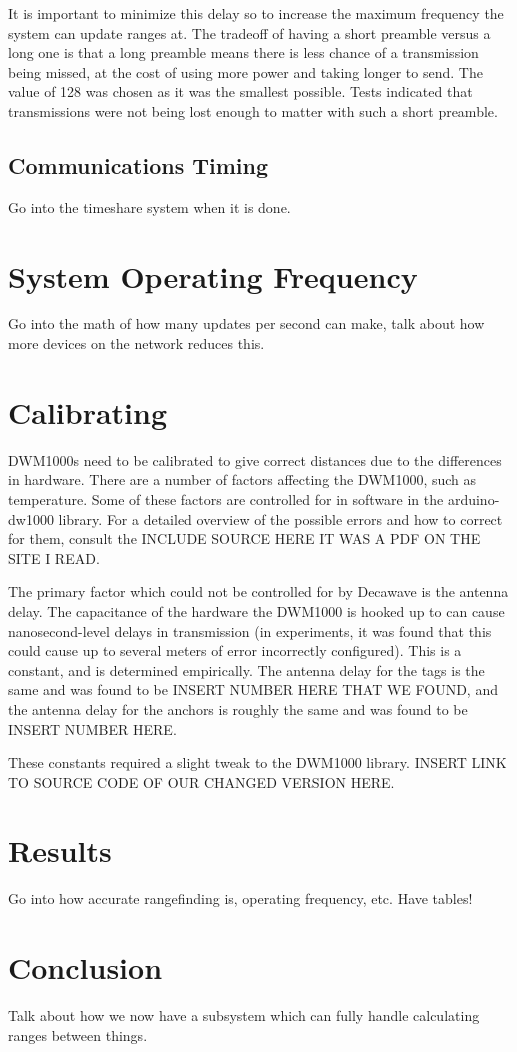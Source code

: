 It is important to minimize this delay so to increase the maximum frequency the system can update ranges at. The tradeoff of having a short preamble versus a long one is that a long preamble means there is less chance of a transmission being missed, at the cost of using more power and taking longer to send. The value of 128 was chosen as it was the smallest possible. Tests indicated that transmissions were not being lost enough to matter with such a short preamble.

\subsection{Communications Timing}
Go into the timeshare system when it is done. 

\section{System Operating Frequency}
Go into the math of how many updates per second can make, talk about how more devices on the network reduces this.

\section{Calibrating}
DWM1000s need to be calibrated to give correct distances due to the differences in hardware. There are a number of factors affecting the DWM1000, such as temperature. Some of these factors are controlled for in software in the arduino-dw1000 library. For a detailed overview of the possible errors and how to correct for them, consult the INCLUDE SOURCE HERE IT WAS A PDF ON THE SITE I READ.

The primary factor which could not be controlled for by Decawave is the antenna delay. The capacitance of the hardware the DWM1000 is hooked up to can cause nanosecond-level delays in transmission (in experiments, it was found that this could cause up to several meters of error incorrectly configured). This is a constant, and is determined empirically. The antenna delay for the tags is the same and was found to be INSERT NUMBER HERE THAT WE FOUND, and the antenna delay for the anchors is roughly the same and was found to be INSERT NUMBER HERE.

These constants required a slight tweak to the DWM1000 library. INSERT LINK TO SOURCE CODE OF OUR CHANGED VERSION HERE.

\section{Results}
Go into how accurate rangefinding is, operating frequency, etc. Have tables!

\section{Conclusion}
Talk about how we now have a subsystem which can fully handle calculating ranges between things.
